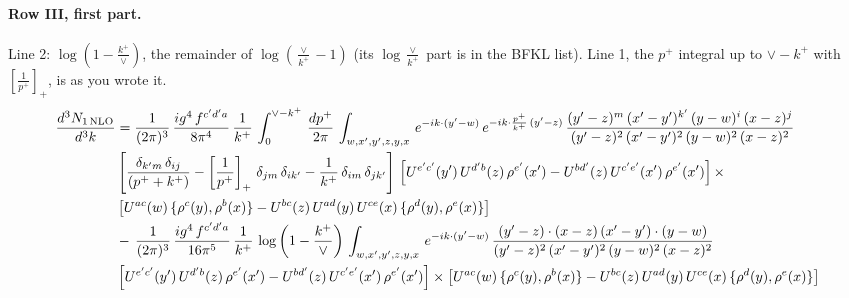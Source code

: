 \documentclass[10pt]{article}
\numberwithin{equation}{section}
\begin{document}
\paragraph{Row III, first part.}
Line 2: $\log(1-\frac{k^+}{\vee})$, the remainder of $\log(\frac{\vee}{k^+}-1)$ (its $\log\frac{\vee}{k^+}$ part is in the BFKL list). Line 1, the $p^+$ integral up to $\vee-k^+$ with $\left[\frac{1}{p^+}\right]_+$, is as you wrote it.
\begin{align}
     \frac{d^{3}N_{1\,\rm NLO}}{d^{3}k} & =  \frac{1}{(2\pi)^{3}}\, \frac{ig^{4}\,f^{c'd'a}}{8\pi^{4}}\, \frac{1}{k^{+}}\,\int_{0}^{\vee-k^{+}}\,  \frac{dp^{+}}{2\pi}\, \int_{w,x',y',z,y,x}\, e^{-ik\cdot (y'-w)}\, e^{-ik\cdot \frac{p^{+}}{k^{+}}\,(y'-z)}\,\frac{(y'-z)^{m}\,(x'-y')^{k'}\,(y-w)^{i}\,(x-z)^{j}}{(y'-z)^{2}\,(x'-y')^{2}\,(y-w)^{2}\,(x-z)^{2}}\notag \\ & \left[\frac{\delta_{k'm}\,\delta_{ij}}{(p^{+}+k^{+})}-\left[\frac{1}{p^{+}}\right]_{+}\,\delta_{jm}\,\delta_{ik'}-\frac{1}{k^{+}}\, \delta_{im}\, \delta_{jk'}\right]\, \left[U^{e'c'}(y')\,U^{d'b}(z)\,\rho^{e'}(x')-U^{bd'}(z)\,U^{c'e'}(x')\,\rho^{e'}(x')\right]\times\notag \\ &  \left[U^{ac}(w)\, \{\rho^{c}(y),\rho^{b}(x)\}-U^{bc}(z)\,U^{ad}(y)\,U^{ce}(x)\,\{\rho^{d}(y),\rho^{e}(x)\}\right] \notag \\
& -\,\frac{1}{(2\pi)^{3}}\, \frac{ig^{4}\,f^{c'd'a}}{16\pi^{5}}\, \frac{1}{k^{+}}\,\log{\left(1-\frac{k^{+}}{\vee}\right)}\, \int_{w,x',y',z,y,x}\, e^{-ik\cdot (y'-w)}\,\frac{(y'-z)\cdot (x-z)\,(x'-y')\cdot (y-w)}{(y'-z)^{2}\,(x'-y')^{2}\,(y-w)^{2}\,(x-z)^{2}}\notag \\ &  \left[U^{e'c'}(y')\,U^{d'b}(z)\,\rho^{e'}(x')-U^{bd'}(z)\,U^{c'e'}(x')\,\rho^{e'}(x')\right]\times  \left[U^{ac}(w)\, \{\rho^{c}(y),\rho^{b}(x)\}-U^{bc}(z)\,U^{ad}(y)\,U^{ce}(x)\,\{\rho^{d}(y),\rho^{e}(x)\}\right] \label{eq:R:G3III1}
\end{align}
\end{document}
